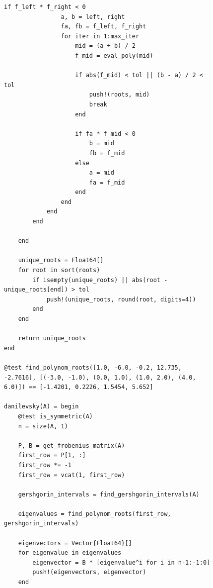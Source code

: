 \documentclass[a4paper, 14pt]{extarticle}
\begin{document}
\begin{figure}[!htb]
\begin{lstlisting}[language={},caption={Метод Крылова (продолжение)},label={lst:code3}]
            if f_left * f_right < 0
                a, b = left, right
                fa, fb = f_left, f_right
                for iter in 1:max_iter
                    mid = (a + b) / 2
                    f_mid = eval_poly(mid)

                    if abs(f_mid) < tol || (b - a) / 2 < tol
                        push!(roots, mid)
                        break
                    end

                    if fa * f_mid < 0
                        b = mid
                        fb = f_mid
                    else
                        a = mid
                        fa = f_mid
                    end
                end
            end
        end

    end

    unique_roots = Float64[]
    for root in sort(roots)
        if isempty(unique_roots) || abs(root - unique_roots[end]) > tol
            push!(unique_roots, round(root, digits=4))
        end
    end

    return unique_roots
end

@test find_polynom_roots([1.0, -6.0, -0.2, 12.735, -2.7616], [(-3.0, -1.0), (0.0, 1.0), (1.0, 2.0), (4.0, 6.0)]) == [-1.4201, 0.2226, 1.5454, 5.652]

danilevsky(A) = begin
    @test is_symmetric(A)
    n = size(A, 1)

    P, B = get_frobenius_matrix(A)
    first_row = P[1, :]
    first_row *= -1
    first_row = vcat(1, first_row)

    gershgorin_intervals = find_gershgorin_intervals(A)

    eigenvalues = find_polynom_roots(first_row, gershgorin_intervals)

    eigenvectors = Vector{Float64}[]
    for eigenvalue in eigenvalues
        eigenvector = B * [eigenvalue^i for i in n-1:-1:0]
        push!(eigenvectors, eigenvector)
    end
\end{lstlisting}
\end{figure}
\end{document}
